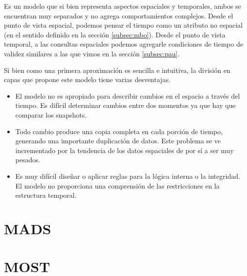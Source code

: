 Es un modelo que si bien representa aspectos espaciales y temporales,
ambos se encuentran muy separados y no agrega comportamientos complejos.
Desde el punto de vista espacial,
podemos pensar el tiempo como un atributo no espacial (en el sentido definido en la sección \ref{subsec:mbo}).
Desde el punto de vista temporal,
a las consultas espaciales podemos agregarle condiciones de tiempo de validez similares a las que vimos en la sección \ref{subsec:pau}.

Si bien como una primera aproximación es sencilla e intuitiva, la división en capas que propone este modelo tiene varias desventajas.
\begin{itemize}
    \item El modelo no es apropiado para describir cambios en el espacio a través del tiempo.
        Es difícil determinar cambios entre dos momentos ya que hay que comparar los snapshots.
    \item Todo cambio produce una copia completa en cada porción de tiempo,
        generando una importante duplicación de datos.
        Este problema se ve incrementado por la tendencia de los datos espaciales de por sí a ser muy pesados.
    \item Es muy difícil diseñar o aplicar reglas para la lógica interna o la integridad.
        El modelo no proporciona una comprensión de las restricciones en la estructura temporal.
\end{itemize}


\section{MADS}






\section{MOST}

